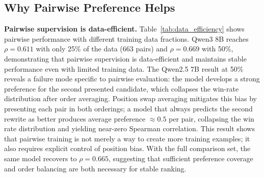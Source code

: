 \documentclass[11pt]{article}
\begin{document}
\subsection{Why Pairwise Preference Helps}

\textbf{Pairwise supervision is data-efficient.}
Table~\ref{tab:data_efficiency} shows pairwise performance with different training data fractions.
Qwen3 8B reaches $\rho=0.611$ with only 25\% of the data (663 pairs) and $\rho=0.669$ with 50\%, demonstrating that pairwise supervision is data-efficient and maintains stable performance even with limited training data.
The Qwen2.5 7B result at 50\% reveals a failure mode specific to pairwise evaluation: the model develops a strong preference for the second presented candidate, which collapses the win-rate distribution after order averaging.
Position swap averaging mitigates this bias by presenting each pair in both orderings; a model that always predicts the second rewrite as better produces average preference $\approx 0.5$ per pair, collapsing the win rate distribution and yielding near-zero Spearman correlation.
This result shows that pairwise training is not merely a way to create more training examples; it also requires explicit control of position bias.
With the full comparison set, the same model recovers to $\rho=0.665$, suggesting that sufficient preference coverage and order balancing are both necessary for stable ranking.

\begin{table}[t]
\centering
\small
\caption{Pairwise data efficiency. Qwen3 8B improves steadily with more comparisons, while Qwen2.5 7B shows a position-bias failure at 50\% (LoRA $r=16$, 3 epochs).}
\label{tab:data_efficiency}
\end{table}
\end{document}
